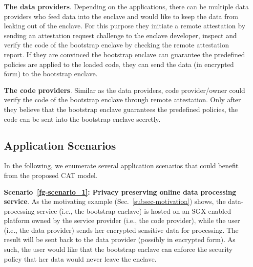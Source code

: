 {\vspace{3pt}\noindent\textbf{The data providers}. Depending on the applications, there can be multiple data providers who feed data into the enclave and would like to keep the data from leaking out of the enclave. For this purpose they initiate a remote attestation by sending an attestation request challenge to the enclave developer, inspect and verify the code of the bootstrap enclave by checking the remote attestation report. If they are convinced the bootstrap enclave can guarantee the predefined policies are applied to the loaded code, they can send the data (in encrypted form) to the bootstrap enclave.

\vspace{3pt}\noindent\textbf{The code providers}. Similar as the data providers, code provider/owner could verify the code of the bootstrap enclave through remote attestation. Only after they believe that the bootstrap enclave guarantees the predefined policies, the code can be sent into the bootstrap enclave secretly.

\subsection{Application Scenarios}\label{subsec-scenarios}

In the following, we enumerate several application scenarios that could benefit from the proposed CAT model. 





\vspace{3pt}\noindent\textbf{Scenario~\ref{fg-scenario_1}: Privacy preserving online data processing service}. As the motivating example (Sec.~\ref{subsec-motivation}) shows, the data-processing service (i.e., the bootstrap enclave) is hosted on an SGX-enabled platform owned by the service provider (i.e., the code provider), while the user (i.e., the data provider) sends her encrypted sensitive data for processing. The result will be sent back to the data provider (possibly in encrypted form). As such, the user would like that the bootstrap enclave can enforce the security policy that her data would never leave the enclave.

}

